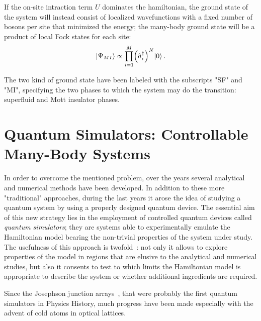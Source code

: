If the on-site intraction term $U$ dominates the hamiltonian, the ground state of the system will instead consist of localized wavefunctions with a fixed number of bosons per site that minimized the energy; the many-body ground state will be a product of local Fock states for each site:
\begin{equation*}
    \ket{\Psi_{MI}} \propto \prod_{i=1}^M \Bigl( \hat{a}^{\dagger}_i\Bigl)^N \ket{0}.
\end{equation*}

The two kind of ground state have been labeled with the subscripts "SF" and "MI", specifying the two phases to which the system may do the transition: superfluid and Mott insulator phases.


\section{Quantum Simulators: Controllable Many-Body Systems}
In order to overcome the mentioned problem, over the years several analytical and numerical methods have been developed. In addition to these more "traditional" approaches, during the last years it arose the idea of studying a quantum system by using a properly designed quantum device. The essential aim of this new strategy lies in the employment of controlled quantum devices called \emph{quantum simulators}; they are systems able to experimentally emulate the Hamiltonian model bearing the non-trivial properties of the system under study. The usefulness of this approach is twofold~\cite{Tomadin_Fazio}:  not only it allows to explore properties of the model in regions that are elusive to the analytical and numerical studies, but also it consents to test to which limits the Hamiltonian model is appropriate to describe the system or whether additional ingredients are required.

Since the Josephson junction arrays~\cite{josephsonArrays}, that were probably the first quantum simulators in Physics History, much progress have been made especially with the advent of cold atoms in optical lattices.

